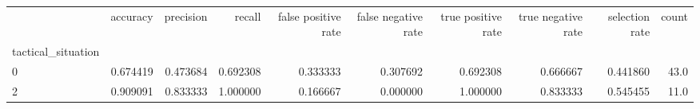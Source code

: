 \begin{tabular}{lrrrrrrrrr}
\toprule
{} &  accuracy &  precision &    recall &  false positive rate &  false negative rate &  true positive rate &  true negative rate &  selection rate &  count \\
tactical\_situation &           &            &           &                      &                      &                     &                     &                 &        \\
\midrule
0                  &  0.674419 &   0.473684 &  0.692308 &             0.333333 &             0.307692 &            0.692308 &            0.666667 &        0.441860 &   43.0 \\
2                  &  0.909091 &   0.833333 &  1.000000 &             0.166667 &             0.000000 &            1.000000 &            0.833333 &        0.545455 &   11.0 \\
\bottomrule
\end{tabular}
